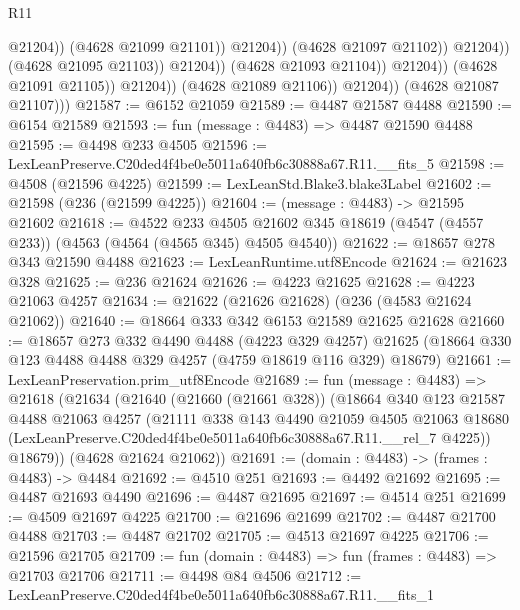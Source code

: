 \begin{lexlean}{R11}
\begin{coremodule}
                                                @21204))
                                            (@4628 @21099 @21101))
                                          @21204))
                                      (@4628 @21097 @21102))
                                    @21204))
                                (@4628 @21095 @21103))
                              @21204))
                          (@4628 @21093 @21104))
                        @21204))
                    (@4628 @21091 @21105))
                  @21204))
              (@4628 @21089 @21106))
            @21204))
        (@4628 @21087 @21107)))
@21587 := @6152 @21059
@21589 := @4487 @21587 @4488
@21590 := @6154 @21589
@21593 := fun (message : @4483) => @4487 @21590 @4488
@21595 := @4498 @233 @4505
@21596 := LexLeanPreserve.C20ded4f4be0e5011a640fb6c30888a67.R11.__fits_5
@21598 := @4508 (@21596 @4225)
@21599 := LexLeanStd.Blake3.blake3Label
@21602 := @21598 (@236 (@21599 @4225))
@21604 := (message : @4483) -> @21595 @21602
@21618 := @4522
    @233
    @4505
    @21602
    @345
    @18619
    (@4547 (@4557 @233))
    (@4563 (@4564 (@4565 @345) @4505 @4540))
@21622 := @18657 @278 @343 @21590 @4488
@21623 := LexLeanRuntime.utf8Encode
@21624 := @21623 @328
@21625 := @236 @21624
@21626 := @4223 @21625
@21628 := @4223 @21063 @4257
@21634 := @21622 (@21626 @21628) (@236 (@4583 @21624 @21062))
@21640 := @18664 @333 @342 @6153 @21589 @21625 @21628
@21660 := @18657
    @273
    @332
    @4490
    @4488
    (@4223 @329 @4257)
    @21625
    (@18664 @330 @123 @4488 @4488 @329 @4257 (@4759 @18619 @116 @329) @18679)
@21661 := LexLeanPreservation.prim_utf8Encode
@21689 := fun (message : @4483) =>
  @21618
    (@21634
      (@21640
        (@21660 (@21661 @328))
        (@18664
          @340
          @123
          @21587
          @4488
          @21063
          @4257
          (@21111
            @338
            @143
            @4490
            @21059
            @4505
            @21063
            @18680
            (LexLeanPreserve.C20ded4f4be0e5011a640fb6c30888a67.R11.__rel_7 @4225))
          @18679))
      (@4628 @21624 @21062))
@21691 := (domain : @4483) -> (frames : @4483) -> @4484
@21692 := @4510 @251
@21693 := @4492 @21692
@21695 := @4487 @21693 @4490
@21696 := @4487 @21695
@21697 := @4514 @251
@21699 := @4509 @21697 @4225
@21700 := @21696 @21699
@21702 := @4487 @21700 @4488
@21703 := @4487 @21702
@21705 := @4513 @21697 @4225
@21706 := @21596 @21705
@21709 := fun (domain : @4483) => fun (frames : @4483) => @21703 @21706
@21711 := @4498 @84 @4506
@21712 := LexLeanPreserve.C20ded4f4be0e5011a640fb6c30888a67.R11.__fits_1

\end{coremodule}
\end{lexlean}
